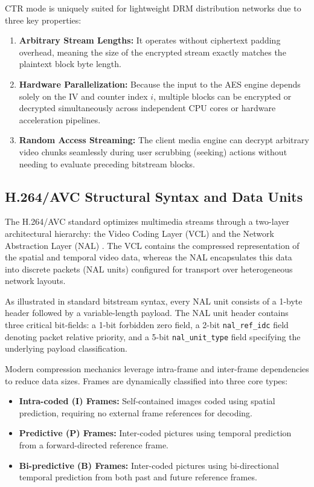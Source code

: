 CTR mode is uniquely suited for lightweight DRM distribution networks due to three key properties:
\begin{enumerate}
    \item \textbf{Arbitrary Stream Lengths:} It operates without ciphertext padding overhead, meaning the size of the encrypted stream exactly matches the plaintext block byte length.
    \item \textbf{Hardware Parallelization:} Because the input to the AES engine depends solely on the $\text{IV}$ and counter index $i$, multiple blocks can be encrypted or decrypted simultaneously across independent CPU cores or hardware acceleration pipelines.
    \item \textbf{Random Access Streaming:} The client media engine can decrypt arbitrary video chunks seamlessly during user scrubbing (seeking) actions without needing to evaluate preceding bitstream blocks.
\end{enumerate}

\subsection{H.264/AVC Structural Syntax and Data Units}
The H.264/AVC standard optimizes multimedia streams through a two-layer architectural hierarchy: the Video Coding Layer (VCL) and the Network Abstraction Layer (NAL) \cite{wiegand2003overview}. The VCL contains the compressed representation of the spatial and temporal video data, whereas the NAL encapsulates this data into discrete packets (NAL units) configured for transport over heterogeneous network layouts.

As illustrated in standard bitstream syntax, every NAL unit consists of a 1-byte header followed by a variable-length payload. The NAL unit header contains three critical bit-fields: a 1-bit forbidden zero field, a 2-bit \texttt{nal\_ref\_idc} field denoting packet relative priority, and a 5-bit \texttt{nal\_unit\_type} field specifying the underlying payload classification. 

Modern compression mechanics leverage intra-frame and inter-frame dependencies to reduce data sizes. Frames are dynamically classified into three core types:
\begin{itemize}
    \item \textbf{Intra-coded (I) Frames:} Self-contained images coded using spatial prediction, requiring no external frame references for decoding.
    \item \textbf{Predictive (P) Frames:} Inter-coded pictures using temporal prediction from a forward-directed reference frame.
    \item \textbf{Bi-predictive (B) Frames:} Inter-coded pictures using bi-directional temporal prediction from both past and future reference frames.
\end{itemize}

